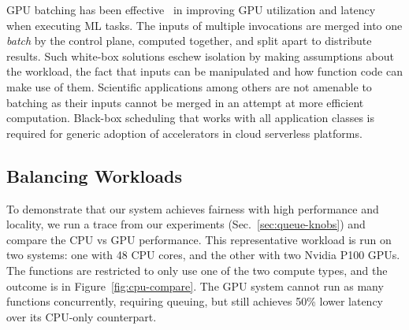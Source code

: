 

GPU batching has been effective~\cite{ali_batch_2020,yang2022infless,ali2022optimizing} in improving GPU utilization and latency when executing ML tasks.
The inputs of multiple invocations are merged into one \emph{batch} by the control plane, computed together, and split apart to distribute results.
Such white-box solutions eschew isolation by making assumptions about the workload, the fact that inputs can be manipulated and how function code can make use of them.
Scientific applications among others are not amenable to batching as their inputs cannot be merged in an attempt at more efficient computation.
Black-box scheduling that works with all application classes is required for generic adoption of accelerators in cloud serverless platforms.


\subsection{Balancing Workloads}


To demonstrate that our system achieves fairness with high performance and locality, we run a trace from our experiments (Sec.~\ref{sec:queue-knobs}) and compare the CPU vs GPU performance.
This representative workload is run on two systems: one with 48 CPU cores, and the other with two Nvidia P100 GPUs.
The functions are restricted to only use one of the two compute types, and the outcome is in Figure~\ref{fig:cpu-compare}.
The GPU system cannot run as many functions concurrently, requiring queuing, but still achieves 50\% lower latency over its CPU-only counterpart.

